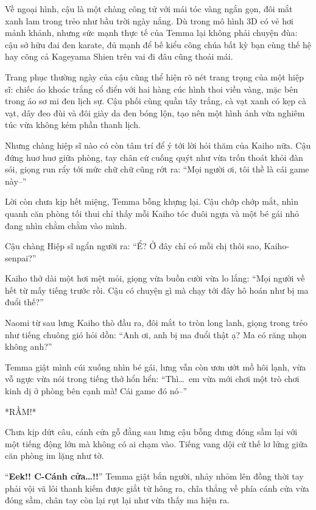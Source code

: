 \documentclass[../main.tex]{subfiles}
\begin{document}
Về ngoại hình, cậu là một chàng công tử với mái tóc vàng ngắn gọn, đôi mắt xanh lam trong trẻo như bầu trời ngày nắng. Dù trong mô hình 3D có vẻ hơi mảnh khảnh, nhưng sức mạnh thực tế của Temma lại không phải chuyện đùa: cậu sở hữu đai đen karate, đủ mạnh để bế kiểu công chúa bất kỳ bạn cùng thế hệ hay cõng cả Kageyama Shien trên vai đi đâu cũng thoải mái.

Trang phục thường ngày của cậu cũng thể hiện rõ nét trang trọng của một hiệp sĩ: chiếc áo khoác trắng cổ điển với hai hàng cúc hình thoi viền vàng, mặc bên trong áo sơ mi đen lịch sự. Cậu phối cùng quần tây trắng, cà vạt xanh có kẹp cà vạt, dây đeo đùi và đôi giày da đen bóng lộn, tạo nên một hình ảnh vừa nghiêm túc vừa không kém phần thanh lịch.

\chrint

Nhưng chàng hiệp sĩ nào có còn tâm trí để ý tới lời hỏi thăm của Kaiho nữa. Cậu đứng huơ huơ giữa phòng, tay chân cứ cuống quýt như vừa trốn thoát khỏi đàn sói, giọng run rẩy tới mức chữ chữ cũng rớt ra: ``Mọi người ơi, tôi thề là cái game này--''


Lời còn chưa kịp hết miệng, Temma bỗng khựng lại. Cậu chớp chớp mắt, nhìn quanh căn phòng tối thui chỉ thấy mỗi Kaiho tóc đuôi ngựa và một bé gái nhỏ đang nhìn chằm chằm vào mình.

Cậu chàng Hiệp sĩ ngẩn người ra: ``Ể? Ở đây chỉ có mỗi chị thôi sao, Kaiho-senpai?''

Kaiho thở dài một hơi mệt mỏi, giọng vừa buồn cười vừa lo lắng: ``Mọi người về hết từ mấy tiếng trước rồi. Cậu có chuyện gì mà chạy tới đây hô hoán như bị ma đuổi thế?''

Naomi từ sau lưng Kaiho thò đầu ra, đôi mắt to tròn long lanh, giọng trong trẻo như tiếng chuông gió hỏi dồn: ``Anh ơi, anh bị ma đuổi thật ạ? Ma có răng nhọn không anh?''

Temma giật mình cúi xuống nhìn bé gái, lưng vẫn còn ươn ướt mồ hôi lạnh, vừa vỗ ngực vừa nói trong tiếng thở hổn hển: ``Thì\dots\ em vừa mới chơi một trò chơi kinh dị ở phòng bên cạnh mà! Cái game đó nó--''

*RẦM!*

Chưa kịp dứt câu, cánh cửa gỗ đằng sau lưng cậu bỗng dưng đóng sầm lại với một tiếng động lớn mà không có ai chạm vào. Tiếng vang dội cứ thế lơ lửng giữa căn phòng im lặng như tờ.

``\textbf{Eek!! C-Cánh cửa\dots!!}'' Temma giật bắn người, nhảy nhỏm lên đồng thời tay phải vội vã lôi thanh kiếm được giắt từ hông ra, chĩa thẳng về phía cánh cửa vừa đóng sầm, chân tay còn lại rụt lại như vừa thấy ma hiện ra.
\end{document}
